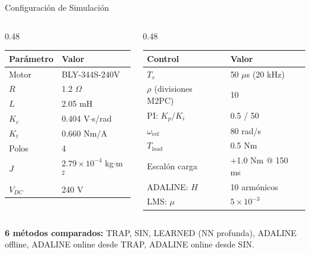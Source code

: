
\begin{frame}{Configuración de Simulación}
    \begin{columns}[T]
    \begin{column}{0.48\textwidth}
        \begin{table}[h]
        \centering
        \small
        \begin{tabular}{@{}ll@{}}
        \toprule
        \textbf{Parámetro} & \textbf{Valor} \\
        \midrule
        Motor & BLY-344S-240V \\
        $R$ & 1.2 $\Omega$ \\
        $L$ & 2.05 mH \\
        $K_e$ & 0.404 V$\cdot$s/rad \\
        $K_t$ & 0.660 Nm/A \\
        Polos & 4 \\
        $J$ & $2.79 \times 10^{-4}$ kg$\cdot$m$^2$ \\
        $V_{DC}$ & 240 V \\
        \bottomrule
        \end{tabular}
        \end{table}
    \end{column}
    \begin{column}{0.48\textwidth}
        \begin{table}[h]
        \centering
        \small
        \begin{tabular}{@{}ll@{}}
        \toprule
        \textbf{Control} & \textbf{Valor} \\
        \midrule
        $T_s$ & 50 $\mu$s (20 kHz) \\
        $\rho$ (divisiones M2PC) & 10 \\
        PI: $K_p / K_i$ & 0.5 / 50 \\
        $\omega_{\text{ref}}$ & 80 rad/s \\
        $T_{\text{load}}$ & 0.5 Nm \\
        Escalón carga & +1.0 Nm @ 150 ms \\
        ADALINE: $H$ & 10 armónicos \\
        LMS: $\mu$ & $5 \times 10^{-3}$ \\
        \bottomrule
        \end{tabular}
        \end{table}
    \end{column}
    \end{columns}
    
    \vspace{0.3cm}
    
    \textbf{6 métodos comparados:} TRAP, SIN, LEARNED (NN profunda), ADALINE offline, ADALINE online desde TRAP, ADALINE online desde SIN.
\end{frame}

